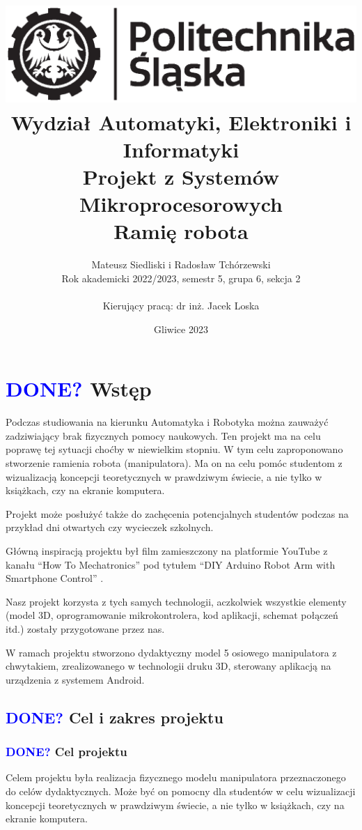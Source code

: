 \documentclass[11pt,titlepage,a4paper]{article}
\title{
\includegraphics[scale=0.75]{img/politechnika_sl_logo_bw_poziom_pl.eps}\\
\textbf{
Wydział Automatyki, Elektroniki i Informatyki}\\
\vspace*{1cm}
Projekt z Systemów Mikroprocesorowych\\
Ramię robota\\
}
\author{Mateusz Siedliski i Radosław Tchórzewski\\
Rok akademicki 2022/2023, semestr 5, grupa 6, sekcja 2\\
\\
Kierujący pracą: dr inż. Jacek Loska}
\date{Gliwice 2023}
\begin{document}
\onehalfspacing

\maketitle

\tableofcontents

\newpage

\section{\textcolor{blue}{DONE?} Wstęp}

Podczas studiowania na kierunku Automatyka i Robotyka można zauważyć zadziwiający brak fizycznych pomocy naukowych. Ten projekt ma na celu poprawę tej sytuacji choćby w niewielkim stopniu. W tym celu zaproponowano stworzenie ramienia robota (manipulatora). Ma on na celu pomóc studentom z wizualizacją koncepcji teoretycznych w prawdziwym świecie, a nie tylko w książkach, czy na ekranie komputera.

Projekt może posłużyć także do zachęcenia potencjalnych studentów podczas na przykład dni otwartych czy wycieczek szkolnych.

Główną inspiracją projektu był film zamieszczony na platformie YouTube z kanału \enquote{How To Mechatronics} pod tytułem \enquote{DIY Arduino Robot Arm with Smartphone Control} \cite*{HTM_YT}.

Nasz projekt korzysta z tych samych technologii, aczkolwiek wszystkie elementy (model 3D, oprogramowanie mikrokontrolera, kod aplikacji, schemat połączeń itd.) zostały przygotowane przez nas.

W ramach projektu stworzono dydaktyczny model 5 osiowego manipulatora z chwytakiem, zrealizowanego w technologii druku 3D, sterowany aplikacją na urządzenia z systemem Android.

\vspace*{2.5cm}

\subsection{\textcolor{blue}{DONE?} Cel i zakres projektu}

\subsubsection{\textcolor{blue}{DONE?} Cel projektu}

Celem projektu była realizacja fizycznego modelu manipulatora przeznaczonego do celów dydaktycznych. Może być on pomocny dla studentów w celu wizualizacji koncepcji teoretycznych w prawdziwym świecie, a nie tylko w książkach, czy na ekranie komputera.
\end{document}
